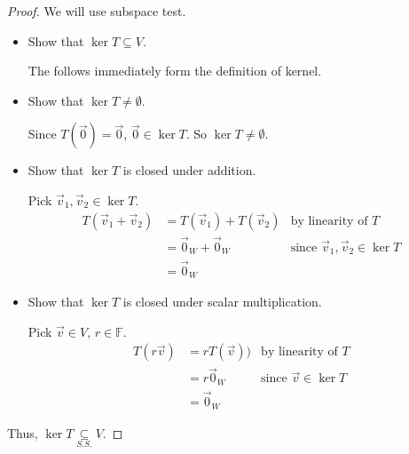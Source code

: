 \documentclass[11pt,fleqn]{book} %
\begin{document}
\begin{proof}
    We will use subspace test.

    \begin{itemize}
        \item Show that $\ker T \subseteq V$.

        The follows immediately form the definition of kernel.

        \item Show that $\ker T \neq \emptyset$.

        Since $T(\vec{0})=\vec{0}$, $\vec{0} \in \ker T$. So $\ker T \neq \emptyset$.

        \item Show that $\ker T$ is closed under addition.

        Pick $\vec{v}_1, \vec{v}_2 \in \ker T$.
        \begin{align*}
            T(\vec{v}_1 + \vec{v}_2)
            &=T(\vec{v}_1) + T(\vec{v}_2)
            &\text{by linearity of }T
            \\
            &=\vec{0}_W+\vec{0}_W
            &\text{since }\vec{v}_1, \vec{v}_2 \in \ker T
            \\
            &=\vec{0}_W
        \end{align*}

        \item Show that $\ker T$ is closed under scalar multiplication.

        Pick $\vec{v} \in V$, $r \in \mathbb{F}$.
        \begin{align*}
            T(r\vec{v})
            &=rT(\vec{v}))
            &\text{by linearity of }T
            \\
            &=r\vec{0}_W
            &\text{since }\vec{v} \in \ker T
            \\
            &=\vec{0}_W
        \end{align*}
    \end{itemize}

    Thus, $\ker T \underset{S.S.}{\subseteq} V$.
\end{proof}
\end{document}
